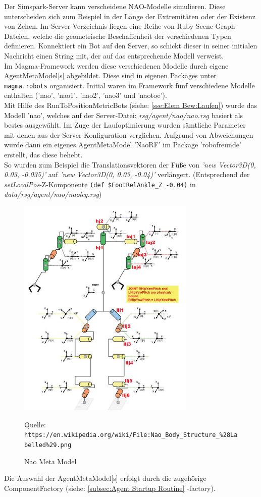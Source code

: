 Der Simspark-Server kann verscheidene NAO-Modelle simulieren. Diese unterscheiden sich zum
Beispiel in der Länge der Extremitäten oder der Existenz von Zehen. Im Server-Verzeichnis
liegen eine Reihe von Ruby-Scene-Graph-Dateien, welche die geometrische Beschaffenheit der
verschiedenen Typen definieren. Konnektiert ein Bot auf den Server, so schickt dieser in seiner initialen Nachricht einen String mit, der auf das entsprechende Modell verweist.\\

Im Magma-Framework werden diese verschiedenen Modelle durch eigene AgentMetaModel[s]
abgebildet. Diese sind in eigenen Packages unter \texttt{magma.robots} organisiert. Initial waren im Framework fünf verschiedene Modelle enthalten ('nao', 'nao1', 'nao2', 'nao3' und 'naotoe').\\
Mit Hilfe des RunToPositionMetricBots (siehe: \ref{sse:Elem Bew:Laufen}) wurde das Modell 'nao', welches auf der Server-Datei: \textit{rsg/agent/nao/nao.rsg} basiert als bestes ausgewählt. Im Zuge der Laufoptimierung wurden sämtliche Parameter mit denen aus der Server-Konfiguration verglichen.
Aufgrund von Abweichungen wurde dann ein eigenes AgentMetaModel 'NaoRF' im Package
'robofreunde' erstellt, das diese behebt.\\
So wurden zum Beispiel die Translationsvektoren der Füße von \textit{'new Vector3D(0, 0.03, -0.035)'}
auf \textit{'new Vector3D(0, 0.03, -0.04)'} verlängert. (Entsprechend der \textit{setLocalPos}-Z-Komponente
\texttt{(def \$FootRelAnkle\_Z -0.04)} in \textit{data/rsg/agent/nao/naoleg.rsg})

\begin{figure}[H]
	\centering
	\includegraphics[width=240pt]{Grafiken/MetaModel/Nao_Body_Structure}
	\caption{Nao Meta Model}{Quelle: \texttt{https://en.wikipedia.org/wiki/File:Nao\_Body\_Structure\_\%28Labelled\%29.png}}
	\label{fig:dribblerekt}
\end{figure}

Die Auswahl der AgentMetaModel[s] erfolgt durch die zugehörige ComponentFactory (siehe: 
\ref{subsec:Agent Startup Routine} -factory). 